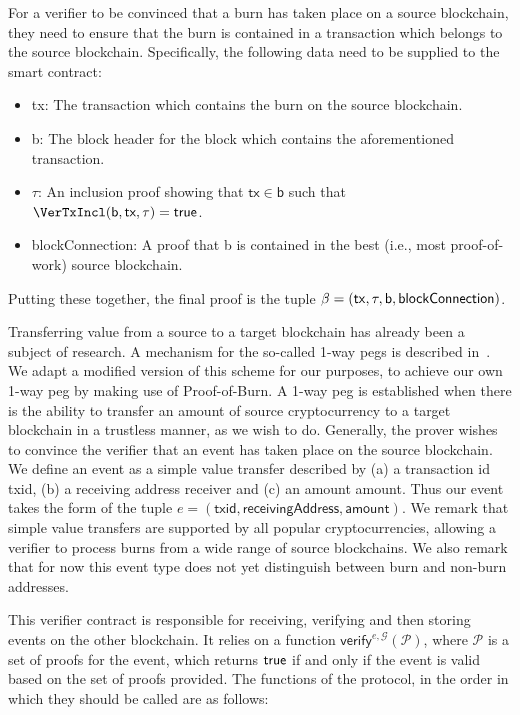 For a verifier to be convinced that a burn has taken place on a source blockchain, they need to ensure that the burn is contained in a transaction which belongs to the source blockchain. Specifically, the following data need to be supplied to the smart contract:

\begin{itemize}
  \item \textsf{tx}: The transaction which contains the burn on the source blockchain.
  \item \textsf{b}: The block header for the block which contains the aforementioned transaction.
  \item $\tau$: An inclusion proof showing that $\mathsf{tx} \in \mathsf{b}$ such that $\VerTxIncl(\textsf{b}, \textsf{tx}, \tau) = \true$.
  \item \textsf{blockConnection}: A proof that \textsf{b} is contained in the best (i.e., most proof-of-work) source blockchain.
\end{itemize}

Putting these together, the final proof is the tuple $\beta = \sf(tx, \tau, b, blockConnection)$.

Transferring value from a source to a target blockchain has already been a subject of research. A mechanism for the so-called 1-way pegs is described in~\cite{pow-sidechains}. We adapt a modified version of this scheme for our purposes, to achieve our own 1-way peg by making use of Proof-of-Burn. A 1-way peg is established when there is the ability to transfer an amount of source cryptocurrency to a target blockchain in a trustless manner, as we wish to do. Generally, the prover wishes to convince the verifier that an event has taken place on the source blockchain. We define an event as a simple value transfer described by (a) a transaction id \textsf{txid}, (b) a receiving address \textsf{receiver} and (c) an amount \textsf{amount}. Thus our event takes the form of the tuple $e = (\textsf{txid}, \textsf{receivingAddress}, \textsf{amount})$. We remark that simple value transfers are supported by all popular cryptocurrencies, allowing a verifier to process burns from a wide range of source blockchains. We also remark that for now this event type does not yet distinguish between burn and non-burn addresses.

This verifier contract is responsible for receiving, verifying and then storing events on the other blockchain. It relies on a function $\mathsf{verify}^{e,\mathcal{G}}(\mathcal{P})$, where $\mathcal{P}$ is a set of proofs for the event, which returns $\mathsf{true}$ if and only if the event is valid based on the set of proofs provided. The functions of the protocol, in the order in which they should be called are as follows:

